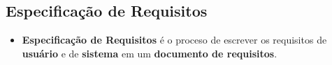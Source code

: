 \documentclass[a4paper, 11pt]{article}
\begin{document}
\subsection{Especificação de Requisitos}
\begin{itemize}
    \item \textbf{Especificação de Requisitos} é o proceso de escrever os requisitos de \textbf{usuário} e de \textbf{sistema} em um \textbf{documento de requisitos}.
\end{itemize}

\end{document}
